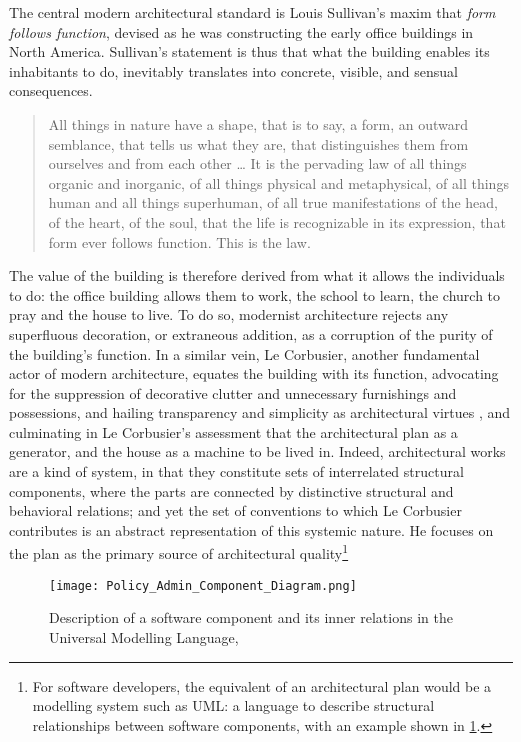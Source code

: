 The central modern architectural standard is Louis Sullivan's maxim that \emph{form follows function}, devised as he was constructing the early office buildings in North America. Sullivan's statement is thus that what the building enables its inhabitants to do, inevitably translates into concrete, visible, and sensual consequences.

\begin{quote}
    All things in nature have a shape, that is to say, a form, an outward semblance, that tells us what they are, that distinguishes them from ourselves and from each other
    \dots
    It is the pervading law of all things organic and inorganic, of all things physical and metaphysical, of all things human and all things superhuman, of all true manifestations of the head, of the heart, of the soul, that the life is recognizable in its expression, that form ever follows function. This is the law. \citep{sullivan_tall_1896}
\end{quote}

The value of the building is therefore derived from what it allows the individuals to do: the office building allows them to work, the school to learn, the church to pray and the house to live. To do so, modernist architecture rejects any superfluous decoration, or extraneous addition, as a corruption of the purity of the building's function. In a similar vein, Le Corbusier, another fundamental actor of modern architecture, equates the building with its function, advocating for the suppression of decorative clutter and unnecessary furnishings and possessions, and hailing transparency and simplicity as architectural virtues \citep{lecorbusier_vers_1923}, and culminating in Le Corbusier's assessment that the architectural plan as a generator, and the house as a machine to be lived in. Indeed, architectural works are a kind of system, in that they constitute sets of interrelated structural components, where the parts are connected by distinctive structural and behavioral relations; and yet the set of conventions to which Le Corbusier contributes is an abstract representation of this systemic nature. He focuses on the plan as the primary source of architectural quality\footnote{For software developers, the equivalent of an architectural plan would be a modelling system such as UML: a language to describe structural relationships between software components, with an example shown in \ref{graphic:uml}.}

\begin{figure}
    \texttt{[image: Policy\_Admin\_Component\_Diagram.png]}
    \caption{Description of a software component and its inner relations in the Universal Modelling Language, \citep{wikipedia_unified_2023}}
    \label{graphic:uml}
\end{figure}

